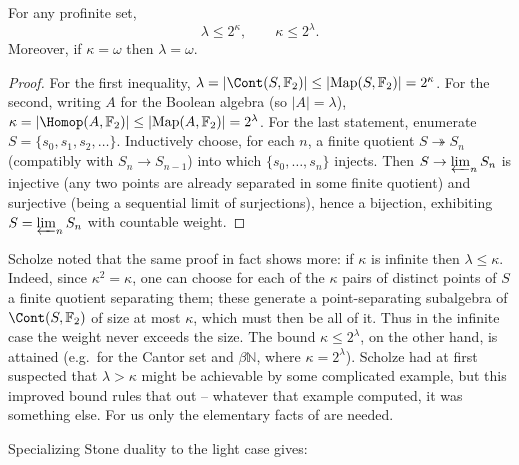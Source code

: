 \begin{proposition}
\label{prop:2:size-weight-ineq}
For any profinite set,
\begin{equation*}
\lambda\le 2^{\kappa},\qquad \kappa\le 2^{\lambda}.
\end{equation*}
Moreover, if $\kappa=\omega$ then $\lambda=\omega$.
\end{proposition}

\begin{proof}
For the first inequality, $\lambda=|\Cont(S,\mathbb{F}_2)|\le
|\mathrm{Map}(S,\mathbb{F}_2)|=2^{\kappa}$. For the second, writing $A$ for the
Boolean algebra (so $|A|=\lambda$),
$\kappa=|\Homop(A,\mathbb{F}_2)|\le|\mathrm{Map}(A,\mathbb{F}_2)|=2^{\lambda}$.
For the last statement, enumerate $S=\{s_0,s_1,s_2,\dots\}$. Inductively choose,
for each $n$, a finite quotient $S\twoheadrightarrow S_n$ (compatibly with
$S_n\to S_{n-1}$) into which $\{s_0,\dots,s_n\}$ injects. Then $S\to
\varprojlim_n S_n$ is injective (any two points are already separated in some
finite quotient) and surjective (being a sequential limit of surjections), hence
a bijection, exhibiting $S=\varprojlim_n S_n$ with countable weight.
\end{proof}

\begin{remark}
\label{rmk:2:gabber}
Scholze noted that the same proof in fact shows more: if $\kappa$ is infinite
then $\lambda\le\kappa$. Indeed, since $\kappa^2=\kappa$, one can choose for each
of the $\kappa$ pairs of distinct points of $S$ a finite quotient separating
them; these generate a point-separating subalgebra of $\Cont(S,\mathbb{F}_2)$ of
size at most $\kappa$, which must then be all of it. Thus in the infinite case the
weight never exceeds the size. The bound $\kappa\le 2^{\lambda}$, on the other
hand, is attained (e.g.\ for the Cantor set and $\beta\mathbb{N}$, where
$\kappa=2^{\lambda}$). Scholze had at first suspected that $\lambda>\kappa$ might
be achievable by some complicated example, but this improved bound rules that out
-- whatever that example computed, it was something else. For us only the
elementary facts of  are needed.
\end{remark}

Specializing Stone duality to the light case gives:

